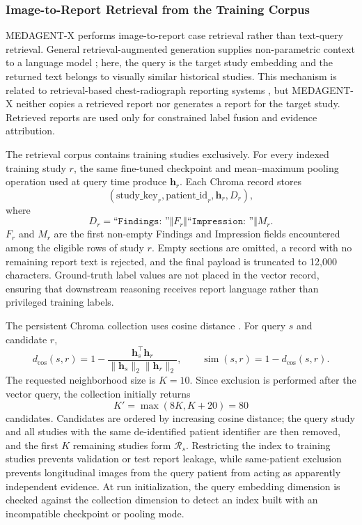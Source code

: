\subsubsection{Image-to-Report Retrieval from the Training Corpus}

MEDAGENT-X performs image-to-report case retrieval rather than text-query retrieval. General retrieval-augmented generation supplies non-parametric context to a language model \cite{lewis2020retrieval,guu2020realm,karpukhin2020dense,khandelwal2020generalization,borgeaud2022improving}; here, the query is the target study embedding and the returned text belongs to visually similar historical studies. This mechanism is related to retrieval-based chest-radiograph reporting systems \cite{endo2021retrieval,ranjit2023retrieval,jeong2024multimodal}, but MEDAGENT-X neither copies a retrieved report nor generates a report for the target study. Retrieved reports are used only for constrained label fusion and evidence attribution.

The retrieval corpus contains training studies exclusively. For every indexed training study $r$, the same fine-tuned checkpoint and mean--maximum pooling operation used at query time produce $\mathbf h_r$. Each Chroma record stores
\[
(\mathrm{study\_key}_r,\mathrm{patient\_id}_r,\mathbf h_r,D_r),
\]
where
\[
D_r=\texttt{``Findings: ''}\Vert F_r\Vert
\texttt{``Impression: ''}\Vert M_r.
\]
$F_r$ and $M_r$ are the first non-empty Findings and Impression fields encountered among the eligible rows of study $r$. Empty sections are omitted, a record with no remaining report text is rejected, and the final payload is truncated to 12,000 characters. Ground-truth label values are not placed in the vector record, ensuring that downstream reasoning receives report language rather than privileged training labels.

The persistent Chroma collection uses cosine distance \cite{chroma2024collections}. For query $s$ and candidate $r$,
\[
d_{\cos}(s,r)=1-
\frac{\mathbf h_s^\top\mathbf h_r}
{\lVert\mathbf h_s\rVert_2\lVert\mathbf h_r\rVert_2},
\qquad
\operatorname{sim}(s,r)=1-d_{\cos}(s,r).
\]
The requested neighborhood size is $K=10$. Since exclusion is performed after the vector query, the collection initially returns
\[
K'=\max(8K,K+20)=80
\]
candidates. Candidates are ordered by increasing cosine distance; the query study and all studies with the same de-identified patient identifier are then removed, and the first $K$ remaining studies form $\mathcal R_s$. Restricting the index to training studies prevents validation or test report leakage, while same-patient exclusion prevents longitudinal images from the query patient from acting as apparently independent evidence. At run initialization, the query embedding dimension is checked against the collection dimension to detect an index built with an incompatible checkpoint or pooling mode.

